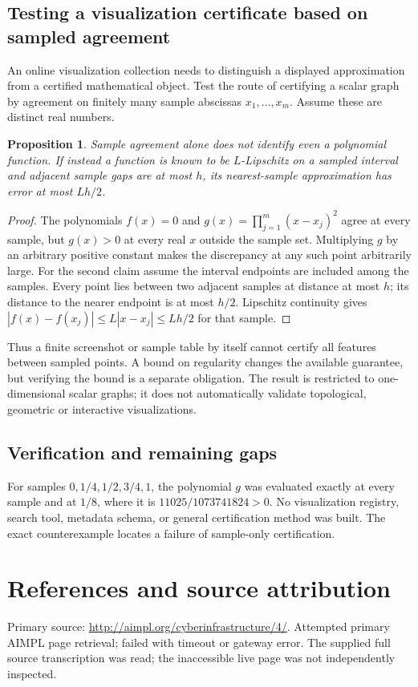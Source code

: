 \documentclass[11pt]{article}
\newtheorem{proposition}{Proposition}
\begin{document}
\subsection{Testing a visualization certificate based on sampled agreement}
An online visualization collection needs to distinguish a displayed approximation from a certified mathematical object. Test the route of certifying a scalar graph by agreement on finitely many sample abscissas $x_1,\ldots,x_m$. Assume these are distinct real numbers.
\begin{proposition}
Sample agreement alone does not identify even a polynomial function. If instead a function is known to be $L$-Lipschitz on a sampled interval and adjacent sample gaps are at most $h$, its nearest-sample approximation has error at most $Lh/2$.
\end{proposition}
\begin{proof}
The polynomials $f(x)=0$ and $g(x)=\prod_{j=1}^m(x-x_j)^2$ agree at every sample, but $g(x)>0$ at every real $x$ outside the sample set. Multiplying $g$ by an arbitrary positive constant makes the discrepancy at any such point arbitrarily large. For the second claim assume the interval endpoints are included among the samples. Every point lies between two adjacent samples at distance at most $h$; its distance to the nearer endpoint is at most $h/2$. Lipschitz continuity gives $|f(x)-f(x_j)|\le L|x-x_j|\le Lh/2$ for that sample.
\end{proof}
Thus a finite screenshot or sample table by itself cannot certify all features between sampled points. A bound on regularity changes the available guarantee, but verifying the bound is a separate obligation. The result is restricted to one-dimensional scalar graphs; it does not automatically validate topological, geometric or interactive visualizations.
\subsection{Verification and remaining gaps}
For samples $0,1/4,1/2,3/4,1$, the polynomial $g$ was evaluated exactly at every sample and at $1/8$, where it is $11025/1073741824>0$. No visualization registry, search tool, metadata schema, or general certification method was built. The exact counterexample locates a failure of sample-only certification.

\section{References and source attribution}
Primary source: \url{http://aimpl.org/cyberinfrastructure/4/}. Attempted primary AIMPL page retrieval; failed with timeout or gateway error. The supplied full source transcription was read; the inaccessible live page was not independently inspected.
\end{document}
